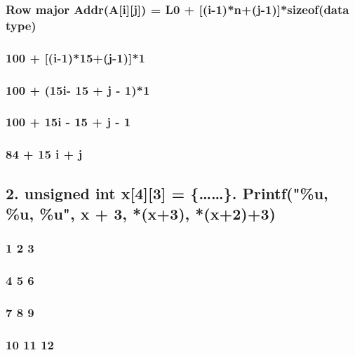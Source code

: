 \documentclass{article}
\begin{document}
\subsubsection{Row major Addr(A[i][j]) = L0 + [(i-1)*n+(j-1)]*sizeof(data type)}
\label{sec:org3fbc03d}

\subsubsection{100 + [(i-1)*15+(j-1)]*1}
\label{sec:org5743141}

\subsubsection{100 + (15i- 15 + j - 1)*1}
\label{sec:org58fee1c}

\subsubsection{100 + 15i - 15 + j - 1}
\label{sec:org5f72e13}

\subsubsection{84 + 15 i + j}
\label{sec:orgf1dbae3}

\subsection{2. unsigned int x[4][3] = \{\ldots{}\ldots{}\}. Printf("\%u, \%u, \%u", x + 3, *(x+3), *(x+2)+3)}
\label{sec:org0f7b496}

\subsubsection{1 2 3}
\label{sec:org7391f94}

\subsubsection{\textbf{4} 5 6}
\label{sec:org5d0219d}

\subsubsection{7 8 9}
\label{sec:org2998a01}

\subsubsection{10 11 12}
\label{sec:orgd1fc024}
\end{document}
